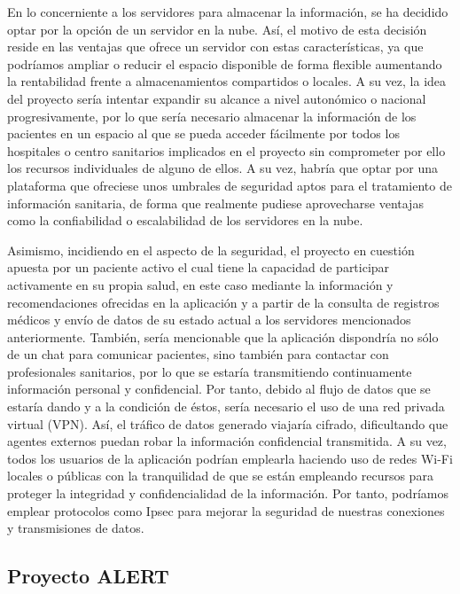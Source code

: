 \documentclass{article}
\begin{document}
En lo concerniente a los servidores para almacenar la información,  se
ha decidido optar por la opción de un servidor en la  nube.   Así,  el
motivo de esta decisión reside en las ventajas que ofrece un  servidor
con estas características, ya  que  podríamos  ampliar	o  reducir  el
espacio disponible de forma flexible aumentando la rentabilidad frente
a almacenamientos compartidos o  locales.   A  su  vez,  la  idea  del
proyecto sería intentar expandir  su  alcance  a  nivel  autonómico  o
nacional progresivamente, por lo  que  sería  necesario  almacenar  la
información de los pacientes en un espacio al  que  se	pueda  acceder
fácilmente por todos los hospitales o centro sanitarios implicados  en
el proyecto sin comprometer por  ello  los  recursos  individuales  de
alguno de ellos.  A su vez, habría que optar por  una  plataforma  que
ofreciese unos umbrales de seguridad  aptos  para  el  tratamiento  de
información sanitaria, de forma  que  realmente  pudiese  aprovecharse
ventajas como la confiabilidad o escalabilidad de los servidores en la
nube.

Asimismo, incidiendo en el aspecto de la  seguridad,  el  proyecto  en
cuestión apuesta por un paciente activo el cual tiene la capacidad  de
participar activamente en su propia salud, en este  caso  mediante  la
información y recomendaciones ofrecidas en la aplicación y a partir de
la consulta de registros médicos y envío de datos de su estado	actual
a los servidores mencionados anteriormente. También, sería mencionable
que la aplicación  dispondría  no  sólo  de  un  chat  para  comunicar
pacientes, sino también para contactar con  profesionales  sanitarios,
por lo que se estaría transmitiendo continuamente información personal
y confidencial.  Por tanto, debido al flujo de datos  que  se  estaría
dando y a la condición de éstos, sería necesario el  uso  de  una  red
privada virtual (VPN).	Así, el tráfico  de  datos  generado  viajaría
cifrado, dificultando que agentes externos puedan robar la información
confidencial  transmitida.   A	su  vez,  todos  los  usuarios	de  la
aplicación podrían emplearla haciendo uso de  redes  Wi-Fi  locales  o
públicas con la tranquilidad de que se están empleando	recursos  para
proteger la integridad y  confidencialidad  de	la  información.   Por
tanto,	podríamos  emplear  protocolos	como  Ipsec  para  mejorar  la
seguridad  de  nuestras   conexiones   y   transmisiones   de	datos.

\subsection{Proyecto ALERT}
\end{document}
